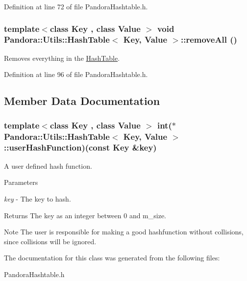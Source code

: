 Definition at line 72 of file PandoraHashtable.h.\hypertarget{classPandora_1_1Utils_1_1HashTable_af541b0c8a7ababea86db5cfda3da0a2e}{
\subsubsection[{removeAll}]{\setlength{\rightskip}{0pt plus 5cm}template$<$class Key , class Value $>$ void {\bf Pandora::Utils::HashTable}$<$ Key, Value $>$::removeAll ()}}
\label{classPandora_1_1Utils_1_1HashTable_af541b0c8a7ababea86db5cfda3da0a2e}


Removes everything in the \hyperlink{classPandora_1_1Utils_1_1HashTable}{HashTable}. 

Definition at line 96 of file PandoraHashtable.h.

\subsection{Member Data Documentation}
\hypertarget{classPandora_1_1Utils_1_1HashTable_a88e480f18940fcecb6d1f8b034986c6d}{
\subsubsection[{userHashFunction}]{\setlength{\rightskip}{0pt plus 5cm}template$<$class Key , class Value $>$ int($\ast$ {\bf Pandora::Utils::HashTable}$<$ Key, Value $>$::{\bf userHashFunction})(const Key \&key)}}
\label{classPandora_1_1Utils_1_1HashTable_a88e480f18940fcecb6d1f8b034986c6d}


A user defined hash function. 
\begin{DoxyParams}{Parameters}
\item[{\em key}]-\/ The key to hash. \end{DoxyParams}
\begin{DoxyReturn}{Returns}
The key as an integer between 0 and m\_\-size. 
\end{DoxyReturn}
\begin{DoxyNote}{Note}
The user is responsible for making a good hashfunction without collisions, since collisions will be ignored. 
\end{DoxyNote}


The documentation for this class was generated from the following files:\begin{DoxyCompactItemize}
\item 
PandoraHashtable.h\end{DoxyCompactItemize}
